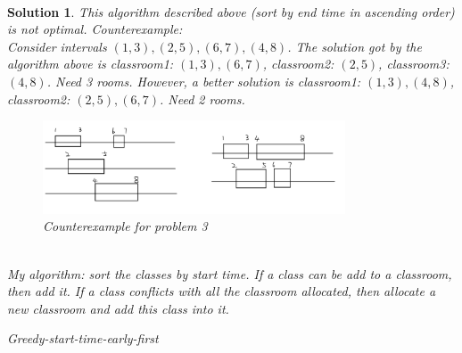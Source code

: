 \documentclass{article}
\newtheorem*{solution}{Solution}
\begin{document}
\begin{enumerate}
~\\
\begin{solution}
    This algorithm described above (sort by end time in ascending order) is not optimal. Counterexample:\\
    Consider intervals $(1,3),(2,5),(6,7),(4,8)$. The solution got by the algorithm above is classroom1: $(1,3),(6,7)$, classroom2: $(2,5)$, classroom3: $(4,8)$. Need 3 rooms.
    However, a better solution is classroom1: $(1,3),(4,8)$, classroom2: $(2,5),(6,7)$. Need 2 rooms.\\
    \begin{figure}[!h]
        \centering
        \caption{Counterexample for problem 3}
        \includegraphics[width=0.8\textwidth]{example2.png}
    \end{figure}\\
    My algorithm: sort the classes by start time. If a class can be add to a classroom, then add it. If a class conflicts with all the classroom allocated, then allocate a new classroom and add this class into it.\\
    \begin{minipage}[t]{0.8\textwidth}
        \begin{algorithm}[H]
            \caption{Greedy-start-time-early-first}\label{Alg-greedy4}
    
            \BlankLine
            

\end{algorithm}
\end{minipage}
\end{solution}
\end{enumerate}
\end{document}
